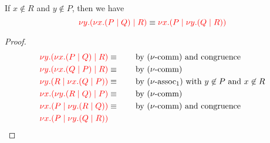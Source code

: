 \begin{lemma}[\cpEquivCutAssNoParen2]\label{thm:cp-cut-assoc2}
  If $x \not\in R$ and $y \not\in P$, then we have
  \[
    \textcolor{red}{\nu y.(\nu x.(P \mid Q) \mid R)} \equiv
    \textcolor{red}{\nu x.(P \mid \nu y.(Q \mid R))}
  \]
\end{lemma}
\begin{proof}
  \begin{align*}
    \tm{\cpCut{y}{\cpCut{x}{P}{Q}}{R}} &\equiv \qquad \text{by \cpEquivCutComm and congruence} \\
    \tm{\cpCut{y}{\cpCut{x}{Q}{P}}{R}} &\equiv \qquad \text{by \cpEquivCutComm} \\
    \tm{\cpCut{y}{R}{\cpCut{x}{Q}{P}}} &\equiv \qquad \text{by \cpEquivCutAss1 with $y \not\in P$ and $x \not\in R$} \\
    \tm{\cpCut{x}{\cpCut{y}{R}{Q}}{P}} &\equiv \qquad \text{by \cpEquivCutComm} \\
    \tm{\cpCut{x}{P}{\cpCut{y}{R}{Q}}} &\equiv \qquad \text{by \cpEquivCutComm and congruence} \\
    \tm{\cpCut{x}{P}{\cpCut{y}{Q}{R}}}
  \end{align*}
\end{proof}
